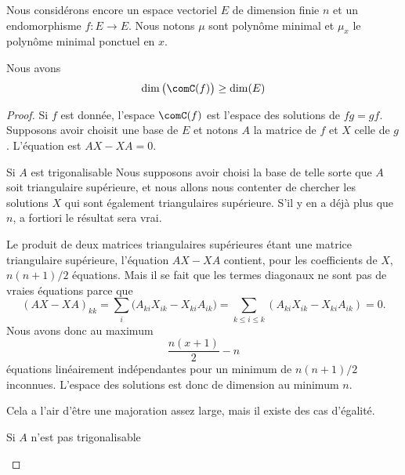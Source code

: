 Nous considérons encore un espace vectoriel \( E\) de dimension finie \( n\) et un endomorphisme \( f\colon E\to E\). Nous notons \( \mu\) sont polynôme minimal et \( \mu_x\) le polynôme minimal ponctuel en \( x\).

\begin{lemma}       \label{LEMooDFFDooJTQkRu}
    Nous avons
    \begin{equation}
        \dim\big( \comC(f) \big)\geq \dim(E)
    \end{equation}
\end{lemma}

\begin{proof}
    Si \( f\) est donnée, l'espace \( \comC(f)\) est l'espace des solutions de \( fg=gf\). Supposons avoir choisit une base de \( E\) et notons \( A\) la matrice de \( f\) et \( X\) celle de \( g\). L'équation est \( AX-XA=0\).
    \begin{subproof}
        \item[Si \( A\) est trigonalisable]
            Nous supposons avoir choisi la base de telle sorte que \( A\) soit triangulaire supérieure, et nous allons nous contenter de chercher les solutions \( X\) qui sont également triangulaires supérieure. S'il y en a déjà plus que \( n\), a fortiori le résultat sera vrai.

            Le produit de deux matrices triangulaires supérieures étant une matrice triangulaire supérieure, l'équation \( AX-XA\) contient, pour les coefficients de \( X\), \( n(n+1)/2\) équations. Mais il se fait que les termes diagonaux ne sont pas de vraies équations parce que
            \begin{equation}
                (AX-XA)_{kk}=\sum_i\big( A_{ki}X_{ik}-X_{ki}A_{ik} \big)=\sum_{k\leq i\leq k}(A_{ki}X_{ik}-X_{ki}A_{ik})=0.
            \end{equation}
            Nous avons donc au maximum 
            \begin{equation}
                \frac{ n(x+1) }{2}-n
            \end{equation}
            équations linéairement indépendantes pour un minimum de \( n(n+1)/2\) inconnues. L'espace des solutions est donc de dimension au minimum \( n\).

            Cela a l'air d'être une majoration assez large, mais il existe des cas d'égalité.

        \item[Si \( A\) n'est pas trigonalisable]


\end{subproof}
\end{proof}

